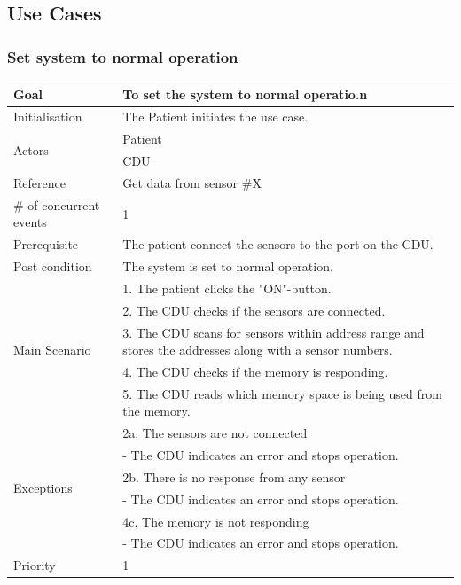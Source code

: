 \subsection{Use Cases}

\subsubsection{Set system to normal operation}

\begin{table}[H]
	\centering
	\begin{tabular}{|l|p{10cm}|}
	\hline
	Goal 							& To set the system to normal operatio.n \\ \hline
	Initialisation 					& The Patient initiates the use case. \\ \hline
	\multirow{2}{*}{Actors} 		& Patient \\ 
									& CDU \\ \hline
	Reference 						& Get data from sensor \#X \\ \hline
	\# of concurrent events 		& 1 \\ \hline
	Prerequisite  					& The patient connect the sensors to the port on the CDU. \\ \hline
	Post condition 					& The system is set to normal operation. \\ \hline
	\multirow{5}{*}{Main Scenario} 	& 1. The patient clicks the  "ON"-button. \\
	& 2. The CDU checks if the sensors are connected.\\
	& 3. The CDU scans for sensors within address range and stores the addresses along with a sensor numbers.\\ 
	& 4. The CDU checks if the memory is responding.\\
	& 5. The CDU reads which memory space is being used from the memory.\\ \hline
	\multirow{6}{*}{Exceptions} & 2a. The sensors are not connected \\ 
								& - The CDU indicates an error and stops operation.\\											& 2b. There is no response from any sensor\\
								& - The CDU indicates an error and stops operation. \\
								& 4c. The memory is not responding\\
								& - The CDU indicates an error and stops operation. \\ 
								\hline
	Priority					& 1\\\hline
	\end{tabular}
\end{table}

